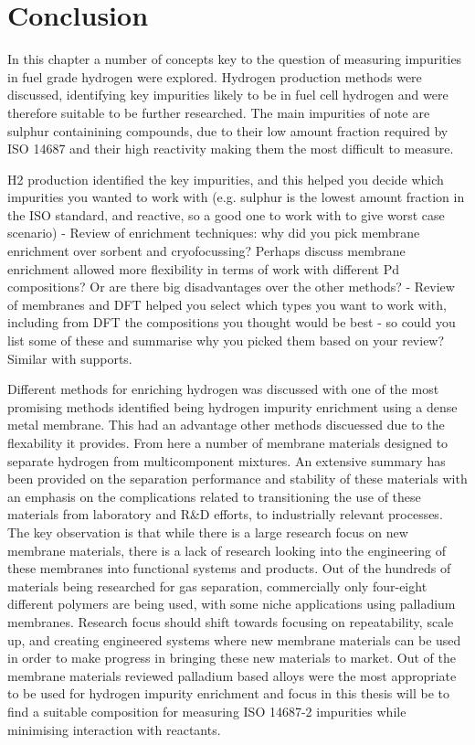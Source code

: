     \eject \pdfpagewidth=8.3in \pdfpageheight=11.7in


\section{Conclusion}
In this chapter a number of concepts key to the question of measuring impurities in fuel grade hydrogen were explored. Hydrogen production methods were discussed, identifying key impurities likely to be in fuel cell hydrogen and were therefore suitable to be further researched. The main impurities of note are sulphur containining compounds, due to their low amount fraction required by ISO 14687 and their high reactivity making them the most difficult to measure. 

H2 production identified the key impurities, and this helped you decide which impurities you wanted to work with (e.g. sulphur is the lowest amount fraction in the ISO standard, and reactive, so a good one to work with to give worst case scenario)
- Review of enrichment techniques: why did you pick membrane enrichment over sorbent and cryofocussing? Perhaps discuss membrane enrichment allowed more flexibility in terms of work with different Pd compositions? Or are there big disadvantages over the other methods?
- Review of membranes and DFT helped you select which types you want to work with, including from DFT the compositions you thought would be best - so could you list some of these and summarise why you picked them based on your review? Similar with supports.

Different methods for enriching hydrogen was discussed with one of the most promising methods identified being hydrogen impurity enrichment using a dense metal membrane. This had an advantage other methods discuessed due to the flexability it provides. From here a number of membrane materials designed to separate hydrogen from multicomponent mixtures. An extensive summary has been provided on the separation performance and stability of these materials with an emphasis on the complications related to transitioning the use of these materials from laboratory and  R\&D efforts, to industrially relevant processes. The key observation is that while there is a large research focus on new membrane materials, there is a lack of research looking into the engineering of these membranes into functional systems and products. Out of the hundreds of materials being researched for gas separation, commercially only four-eight different polymers are being used, with some niche applications using palladium membranes. Research focus should shift towards focusing on repeatability, scale up, and creating engineered systems where new membrane materials can be used in order to make progress in bringing these new materials to market. Out of the membrane materials reviewed palladium based alloys were the most appropriate to be used for hydrogen impurity enrichment and focus in this thesis will be to find a suitable composition for measuring ISO 14687-2 impurities while minimising interaction with reactants. 

